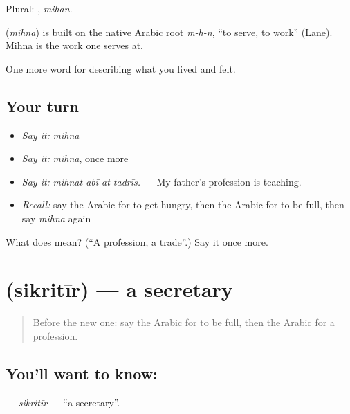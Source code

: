 Plural: , \emph{mihan}.

\begin{cousinweb}
\textbf{} (\emph{mihna}) is built on the native Arabic root \emph{m-h-n}, \textquotedblleft{}to serve, to work\textquotedblright{} (Lane). Mihna is the work one serves at.
\end{cousinweb}

\begin{grammarlens}[title={What you've built}]
One more word for describing what you lived and felt.
\end{grammarlens}

\subsection*{Your turn}
\begin{itemize}
\raggedright
  \item \emph{Say it:} \emph{mihna}
  \item \emph{Say it:} \emph{mihna}, once more
  \item \emph{Say it:} \emph{mihnat abī at-tadrīs.} — My father's profession is teaching.
  \item \emph{Recall:} say the Arabic for to get hungry, then the Arabic for to be full, then say \emph{mihna} again
\end{itemize}

\begin{tcolorbox}[breakable,colback=teal!4,colframe=teal!35!black,title={Before you move on}]
What does  mean? (\textquotedblleft{}A profession, a trade\textquotedblright{}.) Say it once more.
\end{tcolorbox}
\section[\texorpdfstring{\ar{سكرتير} (sikritīr)}{سكرتير (sikritīr)}]{ (sikritīr) — a secretary}

\label{lesson:AR-C518-sikritir}



\begin{quote}
Before the new one: say the Arabic for to be full, then the Arabic for a profession.
\end{quote}

\subsection*{You'll want to know: }
\textbf{} — \emph{sikritīr} — \textquotedblleft{}a secretary\textquotedblright{}.

